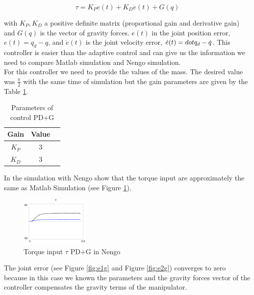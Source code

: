 \begin{equation}
\tau=K_Pe(t)+K_D\dot{e}(t)+G(q)
\end{equation}

with $K_P, K_D$ a positive definite matrix (proportional gain and derivative gain) and $G(q)$ is the vector of gravity forces. $e(t)$ in the joint position error, $e(t)=q_d-q$, and $\dot{e}(t)$ is the joint velocity error, $\dot{e}(t)=\\dot{q_d}-\dot{q}$. This controller is easier than the adaptive control and can give us the information we need to compare Matlab simulation and Nengo simulation.\\

For this controller we need to provide the values of the mass. The desired value was $\frac{\pi}{2}$ with the same time of simulation but the gain parameters are given by the Table \ref{tab3}.\\

\begin{table}[h]
\centering
\caption{Parameters of control PD+G}
\label{tab3}
\begin{tabular}{|c|c|c|}
\hline
\bf{Gain}&\bf{Value}\\\hline
$K_P$&3\\\hline
$K_D$&3\\\hline
\end{tabular}
\end{table}

In the simulation with Nengo show that the torque input are approximately the same as Matlab Simulation (see Figure \ref{fig:t}).\\

\begin{figure}[h]
\centering
\includegraphics[width=0.3\textwidth]{imagenes/6-neuronal/t.png}
 \caption{Torque input $\tau$ PD+G in Nengo}
 \label{fig:t}
\end{figure}

The joint error (see Figure \ref{fig:e1g} and Figure \ref{fig:e2g}) converges to zero because in this case we known the parameters and the  gravity forces vector of the controller compensates the gravity terms of the manipulator.\\

